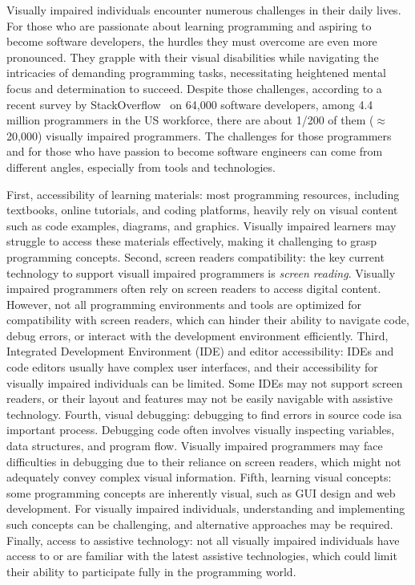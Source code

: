 
Visually impaired individuals encounter numerous challenges in their
daily lives. For those who are passionate about learning programming
and aspiring to become software developers, the hurdles they must
overcome are even more pronounced. They grapple with their visual
disabilities while navigating the intricacies of demanding programming
tasks, necessitating heightened mental focus and determination to
succeed. Despite those challenges, according to a recent survey by
StackOverflow~\cite{blind-code} on 64,000 software developers, among 4.4
million programmers in the US workforce, there are about 1/200 of them
($\approx$ 20,000) visually impaired programmers. The challenges for
those programmers and for those who have passion to become software
engineers can come from different angles, especially from tools
and technologies.

First, accessibility of learning materials: most programming
resources, including textbooks, online tutorials, and coding
platforms, heavily rely on visual content such as code examples,
diagrams, and graphics. Visually impaired learners may struggle to
access these materials effectively, making it challenging to grasp
programming concepts. Second, screen readers compatibility: the key
current technology to support visuall impaired programmers is {\em
screen reading}. Visually impaired programmers often rely on screen
readers to access digital content. However, not all programming
environments and tools are optimized for compatibility with screen
readers, which can hinder their ability to navigate code, debug
errors, or interact with the development environment efficiently.
Third, Integrated Development Environment (IDE) and editor
accessibility: IDEs and code editors usually have complex user
interfaces, and their accessibility for visually impaired individuals
can be limited. Some IDEs may not support screen readers, or their
layout and features may not be easily navigable with assistive
technology. Fourth, visual debugging: debugging to find errors in
source code isa important process. Debugging code often involves
visually inspecting variables, data structures, and program
flow. Visually impaired programmers may face difficulties in debugging
due to their reliance on screen readers, which might not adequately
convey complex visual information. Fifth, learning visual concepts:
some programming concepts are inherently visual, such as GUI design
and web development. For visually impaired individuals, understanding
and implementing such concepts can be challenging, and alternative
approaches may be required. Finally, access to assistive technology:
not all visually impaired individuals have access to or are familiar
with the latest assistive technologies, which could limit their
ability to participate fully in the programming world.

